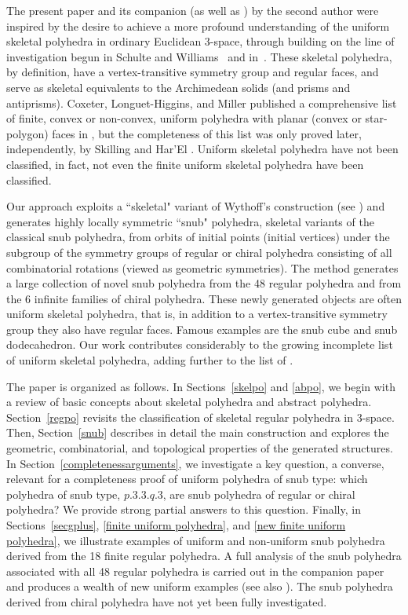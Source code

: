 \documentclass[12pt]{article}
\theoremstyle{definition}\newtheorem{definition}{Definition}[section]
\begin{document}
The present paper and its companion \cite{Sk2} (as well as \cite{Sk1}) by the second author were inspired by the desire to achieve a more profound understanding of the uniform skeletal polyhedra in ordinary Euclidean 3-space, through building on the line of investigation begun in Schulte and Williams~\cite{Wythoffians} and in~\cite{Abby Thesis}. These skeletal polyhedra, by definition, have a vertex-transitive symmetry group and regular faces, and serve as skeletal equivalents to the Archimedean solids (and prisms and antiprisms). Coxeter, Longuet-Higgins, and Miller published a comprehensive list of finite, convex or non-convex, uniform polyhedra with planar (convex or star-polygon) faces in \cite{11}, but the completeness of this list was only proved later, independently, by Skilling \cite{55} and Har'El \cite{30}. Uniform skeletal polyhedra have not been classified, in fact, not even the finite uniform skeletal polyhedra have been classified.  \smallskip

Our approach exploits a ``skeletal" variant of Wythoff's construction (see \cite{7,41}) and generates highly locally symmetric ``snub" polyhedra, skeletal variants of the classical snub polyhedra, from orbits of initial points (initial vertices) under the subgroup of the symmetry groups of regular or chiral polyhedra consisting of all  combinatorial rotations (viewed as geometric symmetries). The method generates a large collection of novel snub polyhedra from the 48 regular polyhedra and from the 6 infinite families of chiral polyhedra.  These newly generated objects are often uniform skeletal polyhedra, that is, in addition to a vertex-transitive symmetry group they also have regular faces. Famous examples are the snub cube and snub dodecahedron. Our work contributes considerably to the growing incomplete list of uniform skeletal polyhedra, adding further to the list of \cite{Wythoffians,Abby Thesis}. \smallskip

The paper is organized as follows. In Sections~\ref{skelpo} and \ref{abpo}, we begin with a review of basic concepts about skeletal polyhedra and abstract polyhedra. Section~\ref{regpo} revisits the classification of skeletal regular polyhedra in 3-space. Then, Section~\ref{snub} describes in detail the main construction and explores the geometric, combinatorial, and topological properties of the generated structures. In Section~\ref{completenessarguments}, we investigate a key question, a converse, relevant for a completeness proof of uniform polyhedra of snub type: which polyhedra of snub type, $p.3.3.q.3$, are snub polyhedra of regular or chiral polyhedra? We provide strong partial answers to this question. Finally, in Sections~\ref{secgplus}, \ref{finite uniform polyhedra}, and \ref{new finite uniform polyhedra}, we illustrate examples of uniform and non-uniform snub polyhedra derived from the 18 finite regular polyhedra. A full analysis of the snub polyhedra associated with all 48 regular polyhedra is carried out in the companion paper \cite{Sk2} and produces a wealth of new uniform examples (see also \cite{Sk1}). The snub polyhedra derived from chiral polyhedra have not yet been fully investigated. 
\smallskip
\end{document}
